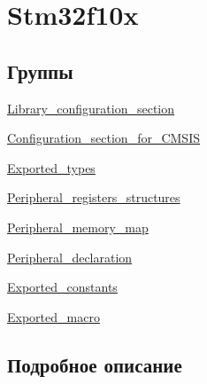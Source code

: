\hypertarget{group__stm32f10x}{}\section{Stm32f10x}
\label{group__stm32f10x}
\subsection*{Группы}
\begin{DoxyCompactItemize}
\item 
\mbox{\hyperlink{group___library__configuration__section}{Library\+\_\+configuration\+\_\+section}}
\item 
\mbox{\hyperlink{group___configuration__section__for___c_m_s_i_s}{Configuration\+\_\+section\+\_\+for\+\_\+\+C\+M\+S\+IS}}
\item 
\mbox{\hyperlink{group___exported__types}{Exported\+\_\+types}}
\item 
\mbox{\hyperlink{group___peripheral__registers__structures}{Peripheral\+\_\+registers\+\_\+structures}}
\item 
\mbox{\hyperlink{group___peripheral__memory__map}{Peripheral\+\_\+memory\+\_\+map}}
\item 
\mbox{\hyperlink{group___peripheral__declaration}{Peripheral\+\_\+declaration}}
\item 
\mbox{\hyperlink{group___exported__constants}{Exported\+\_\+constants}}
\item 
\mbox{\hyperlink{group___exported__macro}{Exported\+\_\+macro}}
\end{DoxyCompactItemize}


\subsection{Подробное описание}
